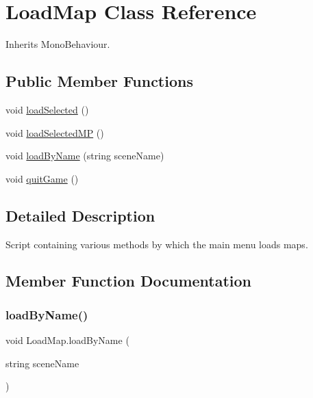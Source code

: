 \hypertarget{class_load_map}{}\section{Load\+Map Class Reference}
\label{class_load_map}


Inherits Mono\+Behaviour.

\subsection*{Public Member Functions}
\begin{DoxyCompactItemize}
\item 
void \hyperlink{class_load_map_a4a8c391affd364e57aa0baa73baf9a47}{load\+Selected} ()
\item 
void \hyperlink{class_load_map_ad9dcb42d843c853bebaf8b0207f74ee9}{load\+Selected\+MP} ()
\item 
void \hyperlink{class_load_map_a28c4cafd20da0967902095f3b8e74aa7}{load\+By\+Name} (string scene\+Name)
\item 
void \hyperlink{class_load_map_a256a172f9b18774eed707b43c1fbd452}{quit\+Game} ()
\end{DoxyCompactItemize}


\subsection{Detailed Description}
Script containing various methods by which the main menu loads maps. 



\subsection{Member Function Documentation}
\mbox{\label{class_load_map_a28c4cafd20da0967902095f3b8e74aa7}} 
\subsubsection{\texorpdfstring{load\+By\+Name()}{loadByName()}}
{\footnotesize\ttfamily void Load\+Map.\+load\+By\+Name (\begin{DoxyParamCaption}\item[{string}]{scene\+Name }\end{DoxyParamCaption})}



